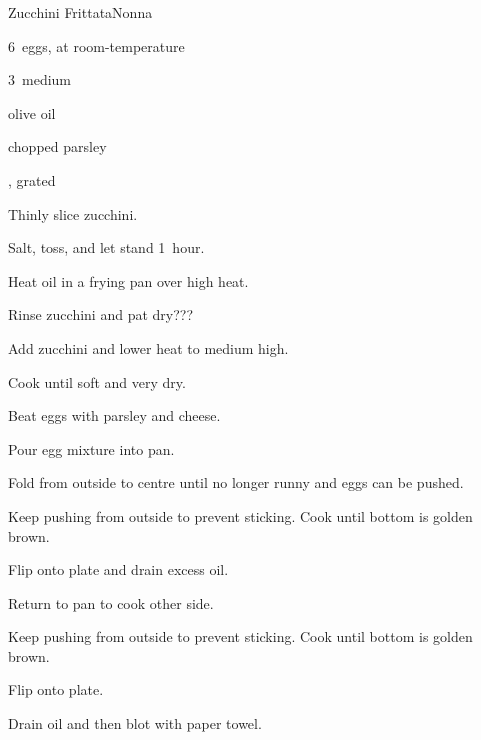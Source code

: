 \begin{recipe}{Zucchini Frittata\FIXME}{Nonna}{}

\begin{ingredients}
\item 6~eggs, at room-temperature
\item 3~medium 
\item olive oil
\item chopped parsley
\item \C{\half} , grated
\end{ingredients}

\begin{directions}
\item Thinly slice zucchini.
\item Salt, toss, and let stand 1~hour.
\item Heat oil in a  frying pan over high heat.
\item Rinse zucchini and pat dry???
\item Add zucchini and lower heat to medium high.
\item Cook until soft and very dry.
\item Beat eggs with parsley and cheese.
\item Pour egg mixture into pan.
\item Fold from outside to centre until no longer runny and eggs can be pushed.
\item Keep pushing from outside to prevent sticking. Cook until bottom is golden brown.
\item Flip onto plate and drain excess oil.
\item Return to pan to cook other side.
\item Keep pushing from outside to prevent sticking. Cook until bottom is golden brown.
\item Flip onto plate.
\item Drain oil and then blot with paper towel.
\end{directions}

\end{recipe}
